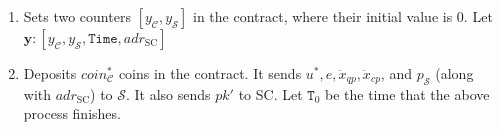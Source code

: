 \begin{enumerate}
\begin{enumerate}
\item Sets two counters $[y_{\scriptscriptstyle\mathcal C}, y_{\scriptscriptstyle\mathcal S}]$ in the contract, where their initial value is $0$. Let $\bm{y}: [y_{\scriptscriptstyle\mathcal C},y_{\scriptscriptstyle\mathcal S},  \texttt{Time},adr_{\scriptscriptstyle \text{SC}}]$

\item Deposits $coin^{\scriptscriptstyle *}_{\scriptscriptstyle\mathcal C}$ coins in the contract. It  sends $u^{\scriptscriptstyle *}, e, \ddot{x}_{\scriptscriptstyle qp},\ddot{x}_{\scriptscriptstyle cp}$, and $p_{\scriptscriptstyle\mathcal{S}}$ (along with $adr_{\scriptscriptstyle \text{SC}}$) to $\mathcal S$. It also sends  $pk'$ to SC. Let $\texttt{T}_{\scriptscriptstyle 0}$ be the time that the above process finishes. 




\end{enumerate}
\end{enumerate}
